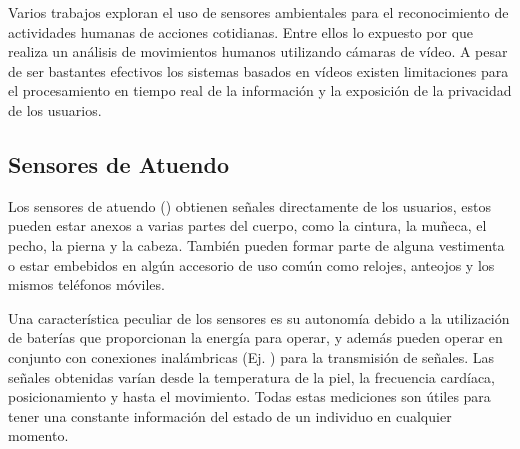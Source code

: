 Varios trabajos exploran el uso de sensores ambientales para el reconocimiento
de actividades humanas de acciones cotidianas. Entre ellos lo expuesto
por\cite{Poppe2007} que realiza un análisis de movimientos humanos
utilizando cámaras de vídeo. A pesar de ser bastantes efectivos los
sistemas basados en vídeos existen limitaciones para el procesamiento
en tiempo real de la información y la exposición de la privacidad
de los usuarios.

\subsection{Sensores de Atuendo}

Los sensores de atuendo (\emph{}) obtienen señales
directamente de los usuarios, estos pueden estar anexos a varias partes
del cuerpo, como la cintura, la muñeca, el pecho, la pierna y la cabeza\cite{Bao2004}.
También pueden formar parte de alguna vestimenta o estar embebidos
en algún accesorio de uso común como relojes, anteojos y los mismos
teléfonos móviles. 

Una característica peculiar de los sensores es su autonomía debido
a la utilización de baterías que proporcionan la energía para operar,
y además pueden operar en conjunto con conexiones inalámbricas (Ej.
) para la transmisión de señales. Las señales obtenidas
varían desde la temperatura de la piel, la frecuencia cardíaca, posicionamiento
y hasta el movimiento. Todas estas mediciones son útiles para tener
una constante información del estado de un individuo en cualquier
momento.

